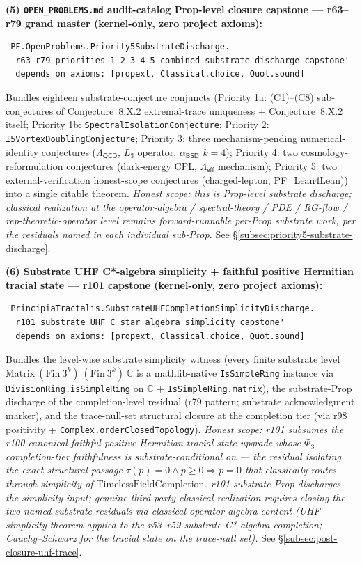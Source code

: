 \documentclass[11pt,a4paper]{amsart}
\theoremstyle{plain}
\theoremstyle{definition}
\begin{document}
\textbf{(5) \texttt{OPEN\_PROBLEMS.md} audit-catalog Prop-level closure capstone --- r63--r79 grand master (kernel-only, zero project axioms):}
\begin{verbatim}
'PF.OpenProblems.Priority5SubstrateDischarge.
  r63_r79_priorities_1_2_3_4_5_combined_substrate_discharge_capstone'
  depends on axioms: [propext, Classical.choice, Quot.sound]
\end{verbatim}
Bundles eighteen substrate-conjecture conjuncts (Priority 1a: (C1)--(C8) sub-conjectures of Conjecture~8.X.2 extremal-trace uniqueness + Conjecture~8.X.2 itself; Priority 1b: \texttt{SpectralIsolationConjecture}; Priority 2: \texttt{I5VortexDoublingConjecture}; Priority 3: three mechanism-pending numerical-identity conjectures ($\Lambda_{\textsf{QCD}}$, $L_3$ operator, $\alpha_{\textsf{BSD}}$ $k = 4$); Priority 4: two cosmology-reformulation conjectures (dark-energy CPL, $\Lambda_{\textsf{eff}}$ mechanism); Priority 5: two external-verification honest-scope conjectures (charged-lepton, PF\_Lean4Lean)) into a single citable theorem. \emph{Honest scope: this is Prop-level substrate discharge; classical realization at the operator-algebra / spectral-theory / PDE / RG-flow / rep-theoretic-operator level remains forward-runnable per-Prop substrate work, per the residuals named in each individual sub-Prop.} See \S\ref{subsec:priority5-substrate-discharge}.

\textbf{(6) Substrate UHF C*-algebra simplicity + faithful positive Hermitian tracial state --- r101 capstone (kernel-only, zero project axioms):}
\begin{verbatim}
'PrincipiaTractalis.SubstrateUHFCompletionSimplicityDischarge.
  r101_substrate_UHF_C_star_algebra_simplicity_capstone'
  depends on axioms: [propext, Classical.choice, Quot.sound]
\end{verbatim}
Bundles the level-wise substrate simplicity witness (every finite substrate level $\mathrm{Matrix}~(\mathrm{Fin}~3^k)~(\mathrm{Fin}~3^k)~\mathbb{C}$ is a mathlib-native \texttt{IsSimpleRing} instance via \texttt{DivisionRing.isSimpleRing} on $\mathbb{C}$ + \texttt{IsSimpleRing.matrix}), the substrate-Prop discharge of the completion-level residual  (r79 pattern; substrate acknowledgment marker), and the trace-null-set structural closure at the completion tier (via r98 positivity + \texttt{Complex.orderClosedTopology}). \emph{Honest scope: r101 subsumes the r100 canonical faithful positive Hermitian tracial state upgrade whose $\Phi_3$ completion-tier faithfulness is substrate-conditional on  --- the residual isolating the exact structural passage $\tau(p) = 0 \wedge p \ge 0 \Rightarrow p = 0$ that classically routes through simplicity of $\mathrm{TimelessFieldCompletion}$. r101 substrate-Prop-discharges the simplicity input; genuine third-party classical realization requires closing the two named substrate residuals via classical operator-algebra content (UHF simplicity theorem applied to the r53--r59 substrate C*-algebra completion; Cauchy--Schwarz for the tracial state on the trace-null set).} See \S\ref{subsec:post-closure-uhf-trace}.
\end{document}
